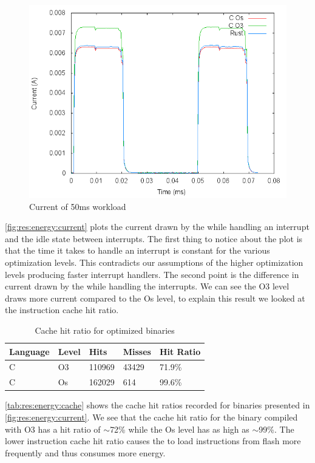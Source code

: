 \begin{figure}[H]
  \includegraphics[width=\textwidth]{results/plots/energy/irq/50.png}
  \caption{Current of 50ms workload}
  \label{fig:res:energy:current}
\end{figure}

\autoref{fig:res:energy:current} plots the current drawn by the {\gecko} while handling an interrupt and the idle state between interrupts.
The first thing to notice about the plot is that the time it takes to handle an interrupt is constant for the various optimization levels.
This contradicts our assumptions of the higher optimization levels producing faster interrupt handlers.
The second point is the difference in current drawn by the {\gecko} while handling the interrupts.
We can see the O3 level draws more current compared to the Os level, to explain this result we looked at the instruction cache hit ratio.

\begin{table}[H]
  \centering
  \begin{tabular}{l | l | l | l | l}
    \textbf{Language} & \textbf{Level} & \textbf{Hits} & \textbf{Misses} & \textbf{Hit Ratio} \\
    \hline
    C & O3 & 110969 & 43429 & 71.9\% \\
    C & Os & 162029 & 614 & 99.6\% \\
    \hline
  \end{tabular}
  \caption{Cache hit ratio for optimized {\C} binaries}
  \label{tab:res:energy:cache}
\end{table}

\autoref{tab:res:energy:cache} shows the cache hit ratios recorded for binaries presented in \autoref{fig:res:energy:current}.
We see that the cache hit ratio for the binary compiled with O3 has a hit ratio of $\sim$72\% while the Os level has as high as $\sim$99\%.
The lower instruction cache hit ratio causes the {\gecko} to load instructions from flash more frequently and thus consumes more energy.
